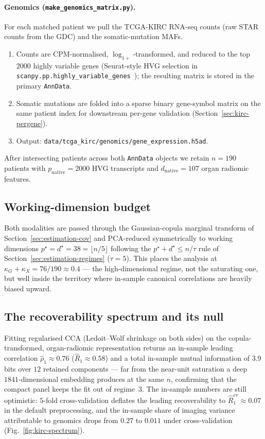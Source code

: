 \documentclass{article}
\begin{document}
\paragraph{Genomics (\texttt{make\_genomics\_matrix.py}).}
For each matched patient we pull the TCGA-KIRC RNA-seq counts (raw STAR counts
from the GDC) and the somatic-mutation MAFs.
\begin{enumerate}
\item Counts are CPM-normalised, $\log_{1+}$-transformed, and reduced to the
top $2000$ highly variable genes (Seurat-style HVG selection in
\texttt{scanpy.pp.highly\_variable\_genes}~\citep{wolf2018scanpy}); the resulting matrix is stored
in the primary \texttt{AnnData}.
\item Somatic mutations are folded into a sparse binary
gene-symbol matrix on the same patient index for downstream per-gene
validation (Section~\ref{sec:kirc-pergene}).
\item Output: \texttt{data/tcga\_kirc/genomics/gene\_expression.h5ad}.
\end{enumerate}
After intersecting patients across both \texttt{AnnData} objects we retain
$n = 190$ patients with $p_{\mathrm{native}} = 2000$ HVG transcripts and
$d_{\mathrm{native}} = 107$ organ radiomic features.

\subsection{Working-dimension budget}
\label{sec:kirc-cohort}
Both modalities are passed through the Gaussian-copula marginal transform of
Section~\ref{sec:estimation-cov} and PCA-reduced symmetrically to working
dimensions $p^\star = d^\star = 38 = \lfloor n / 5 \rfloor$ following the
$p^\star + d^\star \le n/\tau$ rule of
Section~\ref{sec:estimation-regimes} ($\tau = 5$). This places the analysis at
$\kappa_G + \kappa_X = 76/190 \approx 0.4$ --- the high-dimensional regime,
not the saturating one, but well inside the territory where in-sample
canonical correlations are heavily biased upward.

\subsection{The recoverability spectrum and its null}
\label{sec:kirc-spectrum}
Fitting regularised CCA (Ledoit--Wolf shrinkage on both sides) on the
copula-transformed, organ-radiomic representation returns an in-sample leading
correlation $\hat\rho_1 \approx 0.76$ ($\hat R_1 \approx 0.58$) and a total
in-sample mutual information of $3.9$ bits over $12$ retained components --- far
from the near-unit saturation a deep $1841$-dimensional embedding produces at
the same $n$, confirming that the compact panel keeps the fit out of regime~3.
The in-sample numbers are still optimistic: $5$-fold cross-validation deflates
the leading recoverability to $\hat R_1^{\mathrm{cv}} \approx 0.07$ in the
default preprocessing, and the in-sample share of imaging variance attributable
to genomics drops from $0.27$ to $0.011$ under cross-validation
(Fig.~\ref{fig:kirc-spectrum}).
\end{document}
